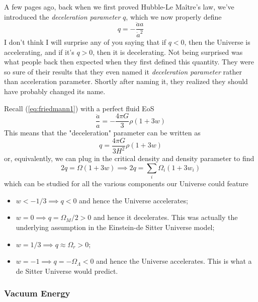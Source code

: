 A few pages ago, back when we first proved Hubble-Le Maître's law, we've introduced the \emph{deceleration parameter} $q$, which we now properly define 
\begin{equation}
    q = -\frac{\ddot{a}a}{\dot{a}^{2}}
    \label{eq:decelerationparam}
\end{equation}
I don't think I will surprise any of you saying that if $q < 0$, then the Universe is accelerating, and if it's $q > 0$, then it is decelerating. Not being surprised was what people back then expected when they first defined this quantity. They were so sure of their results that they even named it \emph{deceleration parameter} rather than acceleration parameter. Shortly after naming it, they realized they should have probably changed its name.
\par Recall (\ref{eq:friedmann1}) with a perfect fluid EoS
\begin{equation}
    \frac{\ddot{a}}{a} = -\frac{4\pi G}{3} \rho(1+3w)
\end{equation}
This means that the "deceleration" parameter can be written as 
\begin{equation}
    q = \frac{4\pi G}{3 H^{2}} \rho (1+3w)
\end{equation}
or, equivalently, we can plug in the critical density and density parameter to find 
\begin{equation}
    2q = \Omega(1+3w) \implies 2q = \sum_{i}\Omega_{i}(1+3w_{i})
\end{equation}
which can be studied for all the various components our Universe could feature
\begin{itemize}
    \item $w < -1/3 \implies q < 0$ and hence the Universe accelerates;
    \item $w=0 \implies q = \Omega_{M}/2 > 0$ and hence it decelerates. This was actually the underlying assumption in the Einstein-de Sitter Universe model;
    \item $w = 1/3 \implies q \approx \Omega_{r} >0$;
    \item $w = -1 \implies q = -\Omega_{\Lambda} < 0$ and hence the Universe accelerates. This is what a de Sitter Universe would predict.
\end{itemize}

\subsubsection{Vacuum Energy}

